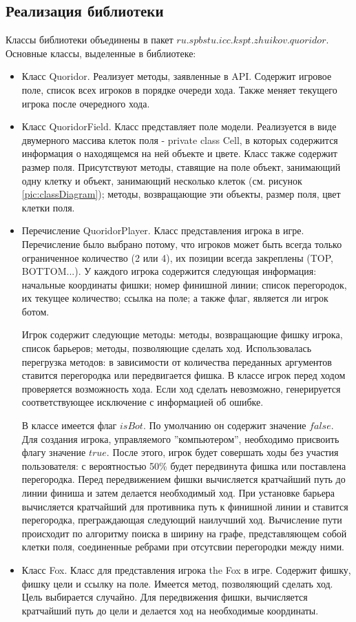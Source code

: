 \documentclass[a4paper]{article}
\begin{document}
\subsection{Реализация библиотеки}
\noindent Классы библиотеки объединены в пакет $ru.spbstu.icc.kspt.zhuikov.quoridor$. Основные классы, выделенные в библиотеке:
\begin{itemize}

\item Класс Quoridor. Реализует методы, заявленные  в API. Содержит игровое поле, список всех игроков в порядке очереди хода. Также меняет текущего игрока после очередного хода. 

\item Класс QuoridorField. Класс представляет поле модели. Реализуется в виде двумерного массива клеток поля - private class Cell, в которых содержится информация о находящемся на ней объекте и цвете. Класс также содержит размер поля. Присутствуют методы, ставящие на поле объект, занимающий одну клетку и объект, занимающий несколько клеток (см. рисунок \ref{pic:classDiagram}); методы, возвращающие эти объекты, размер поля, цвет клетки поля.

\item Перечисление QuoridorPlayer. Класс представления игрока в игре. Перечисление было выбрано потому, что игроков может быть всегда только ограниченное количество (2 или 4), их позиции всегда закреплены (TOP, BOTTOM...). У каждого игрока содержится следующая информация: начальные координаты фишки; номер финишной линии; список перегородок, их текущее количество; ссылка на поле; а также флаг, является ли игрок ботом. 

Игрок содержит следующие методы: методы, возвращающие фишку игрока, список барьеров; методы, позволяющие сделать ход. Использовалась перегрузка методов: в зависимости от количества переданных аргументов ставится перегородка или передвигается фишка. В классе игрок перед ходом проверяется возможность хода. Если ход сделать невозможно, генерируется соответствующее исключение с информацией об ошибке.

В классе имеется флаг $isBot$. По умолчанию он содержит значение $false$. Для создания игрока, управляемого ''компьютером'', необходимо присвоить флагу значение $true$. После этого, игрок будет совершать ходы без участия пользователя: с вероятностью 50\% будет передвинута фишка или поставлена перегородка. Перед передвижением фишки вычисляется кратчайший путь до линии финиша и затем делается необходимый ход. При установке барьера вычисляется кратчайший для противника путь к финишной линии и ставится перегородка, преграждающая следующий наилучший ход. Вычисление пути происходит по алгоритму поиска в ширину на графе, представляющем собой клетки поля, соединенные ребрами при отсутсвии перегородки между ними.
\item Класс Fox. Класс для представления игрока the Fox в игре. Содержит фишку, фишку цели и ссылку на поле. Имеется метод, позволяющий сделать ход. Цель выбирается случайно. Для передвижения фишки, вычисляется кратчайший путь до цели и делается ход на необходимые координаты.


\end{itemize}
\end{document}
